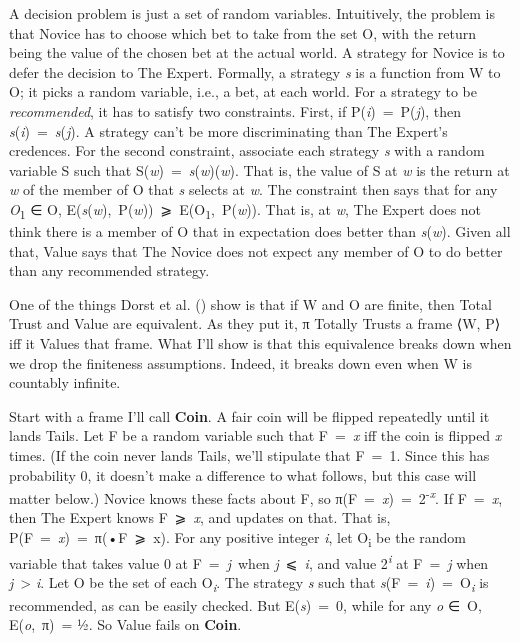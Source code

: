 \documentclass[
  11pt,
  letterpaper,
  DIV=11,
  numbers=noendperiod,
  twoside]{scrartcl}
\begin{document}
A decision problem is just a set of random variables. Intuitively, the
problem is that Novice has to choose which bet to take from the set O,
with the return being the value of the chosen bet at the actual world. A
strategy for Novice is to defer the decision to The Expert. Formally, a
strategy \emph{s} is a function from W to O; it picks a random variable,
i.e., a bet, at each world. For a strategy to be \emph{recommended}, it
has to satisfy two constraints. First, if P(\emph{i})~=~P(\emph{j}),
then \emph{s}(\emph{i})~=~\emph{s}(\emph{j}). A strategy can't be more
discriminating than The Expert's credences. For the second constraint,
associate each strategy \emph{s} with a random variable S such that
S(\emph{w})~=~\emph{s}(\emph{w})(\emph{w}). That is, the value of S at
\emph{w} is the return at \emph{w} of the member of O that \emph{s}
selects at \emph{w}. The constraint then says that for any
\emph{O}\textsubscript{1} ∈ O,
E(\emph{s}(\emph{w}),~P(\emph{w}))~⩾~E(O\textsubscript{1},~P(\emph{w})).
That is, at \emph{w}, The Expert does not think there is a member of O
that in expectation does better than \emph{s}(\emph{w}). Given all that,
Value says that The Novice does not expect any member of O to do better
than any recommended strategy.

One of the things Dorst et al. () show
is that if W and O are finite, then Total Trust and Value are
equivalent. As they put it, π Totally Trusts a frame ⟨W, P⟩ iff it
Values that frame. What I'll show is that this equivalence breaks down
when we drop the finiteness assumptions. Indeed, it breaks down even
when W is countably infinite.

Start with a frame I'll call \textbf{Coin}. A fair coin will be flipped
repeatedly until it lands Tails. Let F be a random variable such that
F~=~\emph{x} iff the coin is flipped \emph{x} times. (If the coin never
lands Tails, we'll stipulate that F~=~1. Since this has probability 0,
it doesn't make a difference to what follows, but this case will matter
below.) Novice knows these facts about F, so
π(F~=~\emph{x})~=~2\textsuperscript{-\emph{x}}. If F~=~\emph{x}, then
The Expert knows F~⩾~\emph{x}, and updates on that. That is,
P(F~=~\emph{x})~=~π(•\textbar F~⩾~x). For any positive integer \emph{i},
let O\textsubscript{i} be the random variable that takes value 0 at
F~=~\emph{j}~when \emph{j}~⩽~\emph{i}, and value
2\textsuperscript{\emph{i}} at F~=~\emph{j} when \emph{j}~\textgreater{}
\emph{i}. Let O be the set of each O\textsubscript{\emph{i}}. The
strategy \emph{s} such that
\emph{s}(F~=~\emph{i})~=~O\textsubscript{\emph{i}} is recommended, as
can be easily checked. But E(\emph{s})~=~0, while for any \emph{o} ∈~O,
E(\emph{o},~π)~= ½. So Value fails on \textbf{Coin}.
\end{document}
